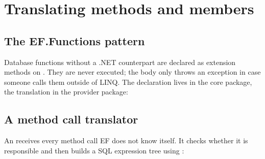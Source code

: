 \chapter{Translating methods and members}\label{ch:translating-methods-and-members}

\section{The EF.Functions pattern}

Database functions without a .NET counterpart are declared as extension methods on
. They are never executed; the body only throws an exception
in case someone calls them outside of LINQ. The declaration lives in the core package, the
translation in the provider package:


\section{A method call translator}

An  receives every method call EF does
not know itself. It checks whether it is responsible and then builds a SQL expression tree
using :


